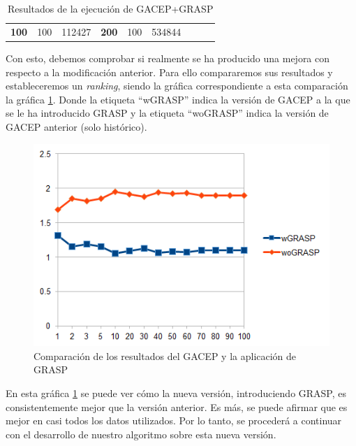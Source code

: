 \begin{table}[]
\begin{tabular}{|cclccllll}
\multicolumn{1}{|c|}{\multirow{-39}{*}{\cellcolor[HTML]{FFFFC7}\textbf{100}}} & \multicolumn{1}{c|}{\multirow{-9}{*}{\cellcolor[HTML]{DDFDFF}100}} & \multicolumn{1}{l|}{\cellcolor[HTML]{DAE8FC}112427}    & \multicolumn{1}{c|}{\multirow{-39}{*}{\cellcolor[HTML]{FFFFC7}\textbf{200}}} & \multicolumn{1}{c|}{\multirow{-10}{*}{\cellcolor[HTML]{DDFDFF}100}} & \multicolumn{1}{l|}{\cellcolor[HTML]{DDFDFF}534844}    &                                                                              &                                                                    &                                                        \\ \cline{1-6}
\end{tabular}
\caption{\label{GACEP_GRASP}Resultados de la ejecución de GACEP+GRASP}
\end{table}

Con esto, debemos comprobar si realmente se ha producido una mejora con respecto a la modificación anterior. 
Para ello compararemos sus resultados y estableceremos un \textit{ranking}, siendo la gráfica correspondiente a esta comparación la gráfica \ref{fig:GRASPvswoGRASP}. 
Donde la etiqueta ``wGRASP'' indica la versión de GACEP a la que se le ha introducido GRASP y la etiqueta ``woGRASP'' indica la versión de GACEP anterior (solo histórico). 

\begin{figure}[h]
		\centering
		\includegraphics[scale=1]{imagenes/Experimental/GRASPvswoGRASP.png}
        \caption{Comparación de los resultados del GACEP y la aplicación de GRASP}
        \label{fig:GRASPvswoGRASP}
\end{figure}

En esta gráfica \ref{fig:GRASPvswoGRASP} se puede ver cómo la nueva versión, introduciendo GRASP, es consistentemente mejor que la versión anterior. 
Es más, se puede afirmar que es mejor en casi todos los datos utilizados. 
Por lo tanto, se procederá a continuar con el desarrollo de nuestro algoritmo sobre esta nueva versión.

